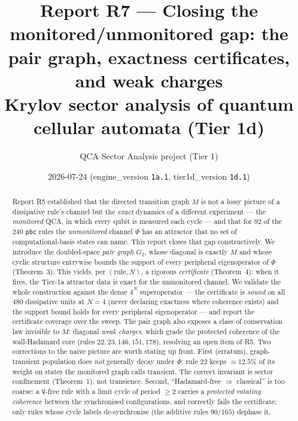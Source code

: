 \documentclass[11pt]{article}
\title{\textbf{Report R7 --- Closing the monitored/unmonitored gap:
the pair graph, exactness certificates, and weak charges}\\
\large Krylov sector analysis of quantum cellular automata (Tier 1d)}
\author{QCA Sector Analysis project (Tier 1)}
\date{2026-07-24 \quad\small(engine\_version \texttt{1a.1}, tier1d\_version
\texttt{1d.1})}
\newcommand{\rt}[1]{\texttt{#1}}
\newcommand{\GG}{G_2}
\theoremstyle{plain}
\theoremstyle{definition}
\begin{document}
\maketitle

\begin{abstract}
Report R5 established that the directed transition graph $M$ is not a lossy
picture of a dissipative rule's channel but the \emph{exact} dynamics of a
different experiment --- the \emph{monitored} QCA, in which every qubit is
measured each cycle --- and that for $92$ of the $240$ \rt{pbc} rules the
\emph{unmonitored} channel $\Phi$ has an attractor that no set of
computational-basis states can name. This report closes that gap constructively.
We introduce the doubled-space \emph{pair graph} $\GG$, whose diagonal is exactly
$M$ and whose cyclic structure entrywise bounds the support of every peripheral
eigenoperator of $\Phi$ (Theorem~3). This yields, per $(\text{rule},N)$, a
rigorous \emph{certificate} (Theorem~4): when it fires, the Tier-1a attractor
data is exact for the unmonitored channel. We validate the whole construction
against the dense $4^N$ superoperator --- the certificate is \emph{sound} on all
$480$ dissipative units at $N=4$ (never declaring exactness where coherence
exists) and the support bound holds for every peripheral eigenoperator --- and
report the certificate coverage over the sweep. The pair graph also exposes a
class of conservation law invisible to $M$: diagonal \emph{weak charges}, which
grade the protected coherence of the wall-Hadamard core (rules
$22,23,146,151,178$), resolving an open item of R5. Two corrections to the naive
picture are worth stating up front. First (erratum), graph-transient population
does \emph{not} generally decay under $\Phi$: rule $22$ keeps
$\approx 12.5\%$ of its weight on states the monitored graph calls transient. The
correct invariant is sector confinement (Theorem~1), not transience.
Second, ``Hadamard-free $\Rightarrow$ classical'' is too coarse: a \rt{V}-free
rule with a limit cycle of period $\ge 2$ carries a \emph{protected rotating
coherence} between the synchronised configurations, and correctly fails the
certificate; only rules whose cycle labels de-synchronise (the additive rules
$90/165$) dephase it.
\end{abstract}
\end{document}

